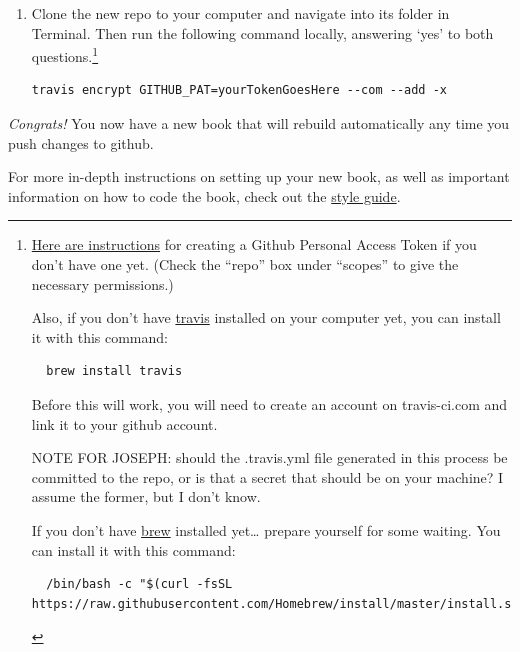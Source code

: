 \documentclass[
]{book}
\begin{document}
\begin{enumerate}
\def\labelenumi{\arabic{enumi}.}
\setcounter{enumi}{2}
\item
  Clone the new repo to your computer and navigate into its folder in Terminal. Then run the following command locally, answering `yes' to both questions.\footnote{\href{https://docs.github.com/en/free-pro-team@latest/github/authenticating-to-github/creating-a-personal-access-token}{Here are instructions} for creating a Github Personal Access Token if you don't have one yet. (Check the ``repo'' box under ``scopes'' to give the necessary permissions.)

    Also, if you don't have \href{https://github.com/travis-ci/travis.rb\#installation}{travis} installed on your computer yet, you can install it with this command:

\begin{Verbatim}
  brew install travis
\end{Verbatim}

    Before this will work, you will need to create an account on travis-ci.com and link it to your github account.

    NOTE FOR JOSEPH: should the .travis.yml file generated in this process be committed to the repo, or is that a secret that should be on your machine? I assume the former, but I don't know.

    If you don't have \href{https://brew.sh}{brew} installed yet\ldots{} prepare yourself for some waiting. You can install it with this command:

\begin{Verbatim}
  /bin/bash -c "$(curl -fsSL https://raw.githubusercontent.com/Homebrew/install/master/install.sh)"
\end{Verbatim}
  }

\begin{verbatim}
travis encrypt GITHUB_PAT=yourTokenGoesHere --com --add -x
\end{verbatim}
\end{enumerate}

\emph{Congrats!} You now have a new book that will rebuild automatically any time you push changes to github.

For more in-depth instructions on setting up your new book, as well as important information on how to code the book, check out the \href{https://warhornmedia.github.io/style-guide}{style guide}.
\end{document}
